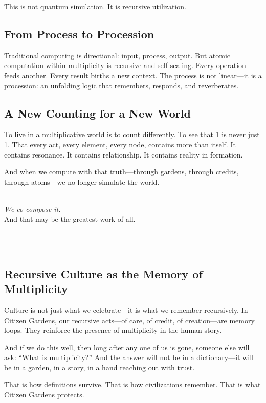 \documentclass[12pt]{article}
\begin{document}
This is not quantum simulation. It is recursive utilization.

\subsection{From Process to Procession}

Traditional computing is directional: input, process, output. But atomic computation within multiplicity is recursive and self-scaling. Every operation feeds another. Every result births a new context. The process is not linear—it is a procession: an unfolding logic that remembers, responds, and reverberates.

\subsection{A New Counting for a New World}

To live in a multiplicative world is to count differently. To see that 1 is never just 1. That every act, every element, every node, contains more than itself. It contains resonance. It contains relationship. It contains reality in formation.

And when we compute with that truth—through gardens, through credits, through atoms—we no longer simulate the world.
\\
\\
\begin{center}
\large \textit {We co-compose it.}
\\
\noindent And that may be the greatest work of all.
\end{center}
\\
\\

\subsection{Recursive Culture as the Memory of Multiplicity}

Culture is not just what we celebrate—it is what we remember recursively. In Citizen Gardens, our recursive acts—of care, of credit, of creation—are memory loops. They reinforce the presence of multiplicity in the human story.

And if we do this well, then long after any one of us is gone, someone else will ask: “What is multiplicity?” And the answer will not be in a dictionary—it will be in a garden, in a story, in a hand reaching out with trust.

That is how definitions survive. That is how civilizations remember. That is what Citizen Gardens protects.
\end{document}
